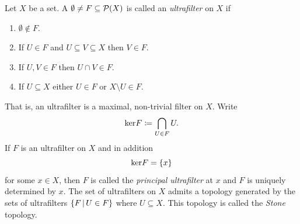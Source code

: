 \begin{definition}
	\label{definition: ultrafilters, principal ultrafilters and the stone-topology}
	
	Let $X$ be a set. A $\emptyset \ne F \subseteq {\mathcal P(X)}$ is called an \emph{ultrafilter} on $X$ if
	\begin{enumerate}
		\item $\emptyset \not\in F$.
		\item If $U \in F$ and $U\subseteq V\subseteq X$ then $V \in F$.
		\item If $U, V\in F$ then $U\cap V\in F$.
		\item If $U\subseteq X$ either $U \in F$ or $X\setminus U\in F$.
	\end{enumerate}
	That is, an ultrafilter is a maximal, non-trivial filter on $X$. Write
		$${\operatorname{ker}} F \coloneqq \bigcap_{U\in F} U.$$
	If $F$ is an ultrafilter on $X$ and in addition
		$${\operatorname{ker}} F = \{x\}$$
	for some $x \in X$, then $F$ is called the \emph{principal ultrafilter} at $x$ and $F$ is uniquely determined by $x$. The set of ultrafilters on $X$ admits a topology generated by the sets of ultrafilters $\{F \,\vert\, U \in F\}$ where $U \subseteq X$. This topology is called the \emph{Stone} topology.
\end{definition}

